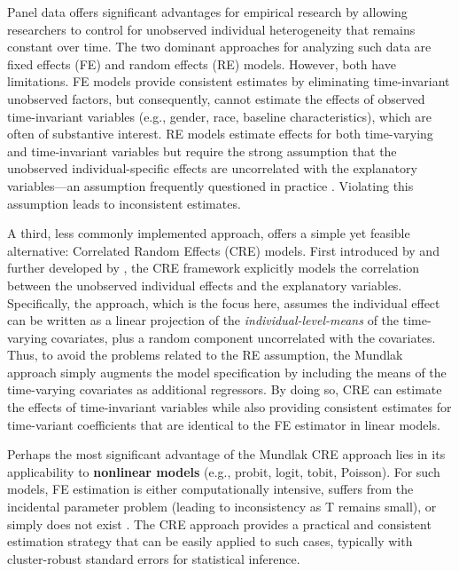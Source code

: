 \documentclass[bib]{statapress}
\begin{document}
Panel data offers significant advantages for empirical research by
allowing researchers to control for unobserved individual heterogeneity
that remains constant over time. The two dominant approaches for
analyzing such data are fixed effects (FE) and random effects (RE)
models. However, both have limitations. FE models provide consistent
estimates by eliminating time-invariant unobserved factors, but
consequently, cannot estimate the effects of observed time-invariant
variables (e.g., gender, race, baseline characteristics), which are
often of substantive interest. RE models estimate effects for both
time-varying and time-invariant variables but require the strong
assumption that the unobserved individual-specific effects are
uncorrelated with the explanatory variables---an assumption frequently
questioned in practice \citep{wooldridge2019}. Violating this assumption
leads to inconsistent estimates.

A third, less commonly implemented approach, offers a simple yet
feasible alternative: Correlated Random Effects (CRE) models. First
introduced by \citet{mundlak1978pooling} and further developed by
\citet{chamberlain1982multivariate}, the CRE framework explicitly models
the correlation between the unobserved individual effects and the
explanatory variables. Specifically, the \citet{mundlak1978pooling}
approach, which is the focus here, assumes the individual effect can be
written as a linear projection of the \emph{individual-level-means} of
the time-varying covariates, plus a random component uncorrelated with
the covariates. Thus, to avoid the problems related to the RE
assumption, the Mundlak approach simply augments the model specification
by including the means of the time-varying covariates as additional
regressors. By doing so, CRE can estimate the effects of time-invariant
variables while also providing consistent estimates for time-variant
coefficients that are identical to the FE estimator in linear models.

Perhaps the most significant advantage of the Mundlak CRE approach lies
in its applicability to \textbf{nonlinear models} (e.g., probit, logit,
tobit, Poisson). For such models, FE estimation is either
computationally intensive, suffers from the incidental parameter problem
(leading to inconsistency as T remains small), or simply does not exist
\citep{wooldridge2019}. The CRE approach provides a practical and
consistent estimation strategy that can be easily applied to such cases,
typically with cluster-robust standard errors
\citep{wooldridge2010econometric, wooldridge2019} for statistical
inference.
\end{document}
